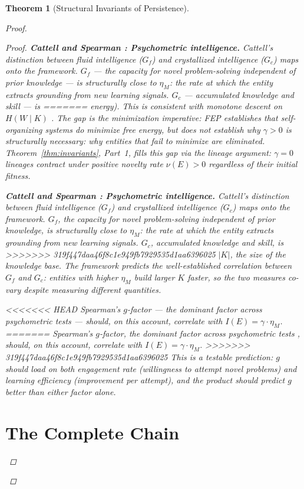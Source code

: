 \documentclass[11pt]{article}
\newtheorem{theorem}{Theorem}
\theoremstyle{definition}
\theoremstyle{remark}
\begin{document}
\begin{theorem}[Structural Invariants of Persistence]
\begin{proof}
\begin{proof}
\textbf{Cattell \cite{Cattell1971} and Spearman \cite{Spearman1904}: Psychometric intelligence.}
Cattell's distinction between fluid intelligence ($G_f$) and crystallized
intelligence ($G_c$) maps onto the framework. $G_f$ --- the capacity for
novel problem-solving independent of prior knowledge --- is structurally
close to $\eta_M$: the rate at which the entity extracts grounding from
new learning signals. $G_c$ --- accumulated knowledge and skill --- is
=======
energy). This is consistent with monotone descent on $H(W \mid K)$
\cite{McCarthy2026d}. The gap is the minimization \emph{imperative}:
FEP establishes that self-organizing systems \emph{do} minimize free
energy, but does not establish why $\gamma > 0$ is structurally necessary:
why entities that fail to minimize are eliminated. Theorem~\ref{thm:invariants},
Part~1, fills this gap via the lineage argument: $\gamma = 0$ lineages
contract under positive novelty rate $\nu(E) > 0$ regardless of their initial fitness.

\textbf{Cattell \cite{Cattell1971} and Spearman \cite{Spearman1904}: Psychometric intelligence.}
Cattell's distinction between fluid intelligence ($G_f$) and crystallized
intelligence ($G_c$) maps onto the framework. $G_f$, the capacity for
novel problem-solving independent of prior knowledge, is structurally
close to $\eta_M$: the rate at which the entity extracts grounding from
new learning signals. $G_c$, accumulated knowledge and skill, is
>>>>>>> 319f447daa46f8c1e949fb7929535d1aa6396025
$|K|$, the size of the knowledge base. The framework predicts the
well-established correlation between $G_f$ and $G_c$: entities with
higher $\eta_M$ build larger $K$ faster, so the two measures co-vary
despite measuring different quantities.

<<<<<<< HEAD
Spearman's $g$-factor --- the dominant factor across psychometric tests
--- should, on this account, correlate with $I(E) = \gamma \cdot \eta_M$.
=======
Spearman's $g$-factor, the dominant factor across psychometric tests
, should, on this account, correlate with $I(E) = \gamma \cdot \eta_M$.
>>>>>>> 319f447daa46f8c1e949fb7929535d1aa6396025
This is a testable prediction: $g$ should load on both engagement rate
(willingness to attempt novel problems) and learning efficiency
(improvement per attempt), and the product should predict $g$ better
than either factor alone.

\section{The Complete Chain}
\label{sec:chain}


\end{proof}
\end{proof}
\end{theorem}
\end{document}
